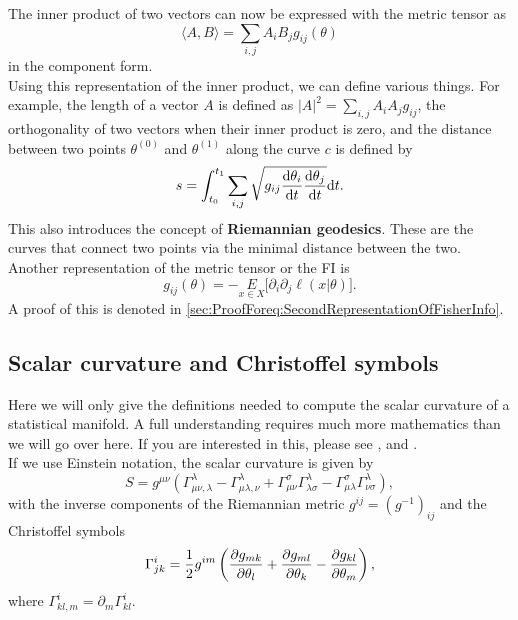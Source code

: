 The inner product of two vectors can now be expressed with the metric tensor as
\begin{equation}
	\langle A,B \rangle = \sum_{i,j} A_iB_jg_{ij}(\theta)
\end{equation}
in the component form. \\
Using this representation of the inner product, we can define various things. For example, the length of a vector $A$ is defined as $|A|^2 = \sum_{i,j} A_iA_j g_{ij}$, the orthogonality of two vectors when their inner product is zero, and the distance between two points $\theta^{(0)}$ and $\theta^{(1)}$ along the curve $c$ is defined by 
\begin{equation}
	s = \int_{t_0}^{t_1} \sum_{i,j} \sqrt{g_{ij}\frac{\mathrm{d}\theta_i}{\mathrm{d}t}\frac{\mathrm{d}\theta_j}{\mathrm{d}t}} \mathrm{d}t. 
\end{equation}
This also introduces the concept of \textbf{Riemannian geodesics}. These are the curves that connect two points via the minimal distance between the two.\\
Another representation of the metric tensor or the FI is 
\begin{equation}\label{eq:SecondRepresentationOfFisherInfo}
	g_{ij}(\theta) = - \underset{x\in X}{E} \Big[ \partial_i \partial_j \ell(x|\theta) \Big].
\end{equation}
A proof of this is denoted in \cref{sec:ProofForeq:SecondRepresentationOfFisherInfo}.

\subsection{Scalar curvature and Christoffel symbols}
Here we will only give the definitions needed to compute the scalar curvature of a statistical manifold. A full understanding requires much more mathematics than we will go over here. If you are interested in this, please see \cite{AmarisLectureNotes}, \cite{PaperOnCurvature} and \cite{GeneralRelativityBook}.\\
If we use Einstein notation, the scalar curvature is given by 
\begin{equation}
	S = g^{\mu \nu} \left(\Gamma^{\lambda}_{\mu \nu, \lambda} -\Gamma^{\lambda}_{\mu \lambda, \nu}
	+\Gamma^{\sigma}_{\mu \nu}\Gamma^{\lambda}_{\lambda \sigma}
	-\Gamma^{\sigma}_{\mu \lambda}
	\Gamma^{\lambda}_{\nu \sigma}\right),
\end{equation}
with the inverse components of the Riemannian metric $g^{ij} = (g^{-1})_{ij}$ and the Christoffel symbols
\begin{equation}
	\Gamma^{i}_{jk} = \frac{1}{2}g^{im} \left(\frac{\partial g_{mk}}{\partial\theta_l} + \frac{\partial g_{ml}}{\partial\theta_k} - \frac{\partial g_{kl}}{\partial\theta_m}\right),
\end{equation}
where $\Gamma^{i}_{kl,m} = \partial_m \Gamma^{i}_{kl}$.